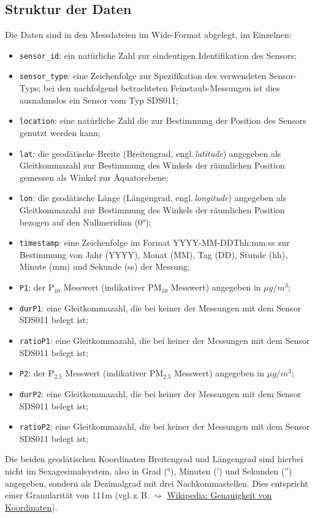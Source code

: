 \subsection{Struktur der Daten}  
\label{KapitelDatenanalyseDatenStruktur}  
Die Daten sind in den Messdateien im Wide-Format abgelegt, im Einzelnen:
\begin{itemize}[topsep=2pt,parsep=1pt,itemsep=0.5pt]
\item[$\circ$] \texttt{sensor\_id}: ein natürliche Zahl zur eindeutigen
Identifikation des Sensors;
\item[$\circ$] \texttt{sensor\_type}: eine Zeichenfolge zur Spezifikation
 des verwendeten Sensor-Typs; bei den nachfolgend betrachteten 
 Feinstaub-Messungen ist dies ausnahmslos ein Sensor vom Typ SDS011;
\item[$\circ$] \texttt{location}: eine natürliche Zahl die zur Bestimmung 
der Position des Sensors genutzt werden kann; 
\item[$\circ$] \texttt{lat}: die geodätische Breite (Breitengrad, 
engl.\,\textit{latitude}) angegeben als Gleitkommazahl zur Bestimmung des Winkels 
der räumlichen Position gemessen als Winkel zur Äquatorebene; 
\item[$\circ$] \texttt{lon}: die geodätische Länge (Längengrad, 
engl.\,\textit{longitude}) angegeben als Gleitkommazahl zur Bestimmung des Winkels 
der räumlichen Position bezogen auf den Nullmeridian (0°); 
\item[$\circ$] \texttt{timestamp}: eine Zeichenfolge im Format
YYYY-MM-DDThh:mm:ss zur Bestimmung von Jahr (YYYY), Monat (MM), Tag (DD),
Stunde (hh), Minute (mm) und Sekunde (ss) der Messung;
\item[$\circ$] \texttt{P1}: der $\mathrm{P}_{10}$ Messwert 
(indikativer $\mathrm{PM}_{10}$ Messwert) angegeben in $\mu g/m^3$;
\item[$\circ$] \texttt{durP1}: eine Gleitkommazahl, die bei keiner der Messungen 
mit dem Sensor SDS011 belegt ist; 
\item[$\circ$] \texttt{ratioP1}: eine Gleitkommazahl, die bei keiner der Messungen 
mit dem Sensor SDS011 belegt ist; 
\item[$\circ$] \texttt{P2}: der $\mathrm{P}_{2.5}$ Messwert 
(indikativer $\mathrm{PM}_{2.5}$ Messwert) angegeben in $\mu g/m^3$;
\item[$\circ$] \texttt{durP2}: eine Gleitkommazahl, die bei keiner der Messungen 
mit dem Sensor SDS011 belegt ist; 
\item[$\circ$] \texttt{ratioP2}: eine Gleitkommazahl, die bei keiner der Messungen 
mit dem Sensor SDS011 belegt ist; 
\end{itemize}
 Die beiden geodätischen Koordinaten
Breitengrad und Längengrad sind hierbei nicht im Sexagesimalsystem, also in
Grad (°), Minuten (') und Sekunden ('') angegeben, sondern als Dezimalgrad mit 
drei Nachkommastellen. Dies entspricht einer Granularität von 111m
(vgl.\,z.\,B.\,$\rightsquigarrow$ 
\href{https://wiki.openstreetmap.org/wiki/DE:Genauigkeit_von_Koordinaten}
{Wikipedia: Genauigkeit von Koordinaten}).\\

